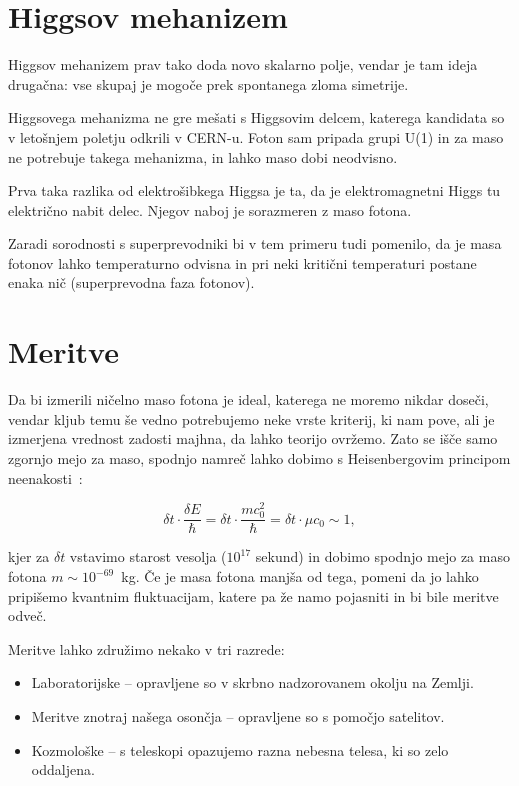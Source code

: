 \documentclass[a4paper, twocolumn, titlepage]{article}
\begin{document}
\section{Higgsov mehanizem}

Higgsov mehanizem prav tako doda novo skalarno polje, vendar je tam ideja druga\v cna: vse skupaj je mogo\v ce prek
spontanega zloma simetrije.

Higgsovega mehanizma ne gre me\v sati s Higgsovim delcem, katerega kandidata so v leto\v snjem poletju odkrili v CERN-u.
Foton sam pripada grupi U(1) in za maso ne potrebuje takega mehanizma, in lahko maso dobi neodvisno.

Prva taka razlika od elektro\v sibkega Higgsa je ta, da je elektromagnetni Higgs tu elektri\v cno nabit delec. Njegov
naboj je sorazmeren z maso fotona.

Zaradi sorodnosti s superprevodniki bi v tem primeru tudi pomenilo, da je masa fotonov lahko temperaturno odvisna in pri
neki kriti\v cni temperaturi postane enaka ni\v c (superprevodna faza fotonov).

\section{Meritve}

Da bi izmerili ni\v celno maso fotona je ideal, katerega ne moremo nikdar dose\v ci, vendar kljub temu \v se vedno
potrebujemo neke vrste kriterij, ki nam pove, ali je izmerjena vrednost zadosti majhna, da lahko teorijo ovr\v zemo.
Zato se i\v s\v ce samo zgornjo mejo za maso, spodnjo namre\v c lahko dobimo s Heisenbergovim principom
neenakosti~\cite{over}:

\begin{equation}
	\delta t \cdot \frac{\delta E}{\hbar} = \delta t \cdot \frac{mc_0^2}{\hbar} = \delta t \cdot \mu c_0 \sim 1,
\end{equation}

kjer za $\delta t$ vstavimo starost vesolja ($10^{17}$ sekund) in dobimo spodnjo mejo za maso fotona \hbox{$m \sim
10^{-69}$ kg}.
\v Ce je masa fotona manj\v sa od tega, pomeni da jo lahko pripi\v semo kvantnim fluktuacijam, katere pa \v ze namo
pojasniti in bi bile meritve odve\v c.

Meritve lahko združimo nekako v tri razrede:
\begin{itemize}
	\item{Laboratorijske -- opravljene so v skrbno nadzorovanem okolju na Zemlji.}
	\item{Meritve znotraj na\v sega oson\v cja -- opravljene so s pomočjo satelitov.}
	\item{Kozmološke -- s teleskopi opazujemo razna nebesna telesa, ki so zelo oddaljena.}
\end{itemize}
\end{document}
